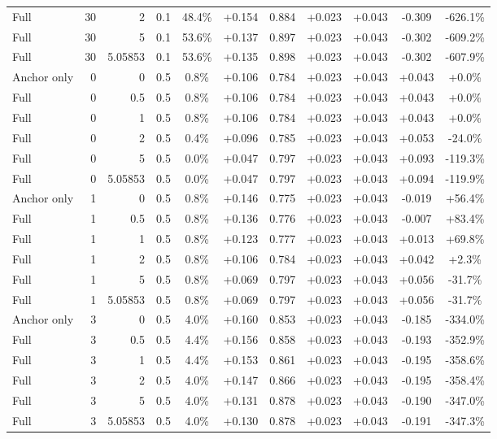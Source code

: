 \begin{table}[htbp]
\begin{tabular}{lrrrccccccc}
Full & 30 & 2 & 0.1 & 48.4\% & +0.154 & 0.884 & +0.023 & +0.043 & -0.309 & -626.1\% \\
Full & 30 & 5 & 0.1 & 53.6\% & +0.137 & 0.897 & +0.023 & +0.043 & -0.302 & -609.2\% \\
Full & 30 & 5.05853 & 0.1 & 53.6\% & +0.135 & 0.898 & +0.023 & +0.043 & -0.302 & -607.9\% \\
Anchor only & 0 & 0 & 0.5 & 0.8\% & +0.106 & 0.784 & +0.023 & +0.043 & +0.043 & +0.0\% \\
Full & 0 & 0.5 & 0.5 & 0.8\% & +0.106 & 0.784 & +0.023 & +0.043 & +0.043 & +0.0\% \\
Full & 0 & 1 & 0.5 & 0.8\% & +0.106 & 0.784 & +0.023 & +0.043 & +0.043 & +0.0\% \\
Full & 0 & 2 & 0.5 & 0.4\% & +0.096 & 0.785 & +0.023 & +0.043 & +0.053 & -24.0\% \\
Full & 0 & 5 & 0.5 & 0.0\% & +0.047 & 0.797 & +0.023 & +0.043 & +0.093 & -119.3\% \\
Full & 0 & 5.05853 & 0.5 & 0.0\% & +0.047 & 0.797 & +0.023 & +0.043 & +0.094 & -119.9\% \\
Anchor only & 1 & 0 & 0.5 & 0.8\% & +0.146 & 0.775 & +0.023 & +0.043 & -0.019 & +56.4\% \\
Full & 1 & 0.5 & 0.5 & 0.8\% & +0.136 & 0.776 & +0.023 & +0.043 & -0.007 & +83.4\% \\
Full & 1 & 1 & 0.5 & 0.8\% & +0.123 & 0.777 & +0.023 & +0.043 & +0.013 & +69.8\% \\
Full & 1 & 2 & 0.5 & 0.8\% & +0.106 & 0.784 & +0.023 & +0.043 & +0.042 & +2.3\% \\
Full & 1 & 5 & 0.5 & 0.8\% & +0.069 & 0.797 & +0.023 & +0.043 & +0.056 & -31.7\% \\
Full & 1 & 5.05853 & 0.5 & 0.8\% & +0.069 & 0.797 & +0.023 & +0.043 & +0.056 & -31.7\% \\
Anchor only & 3 & 0 & 0.5 & 4.0\% & +0.160 & 0.853 & +0.023 & +0.043 & -0.185 & -334.0\% \\
Full & 3 & 0.5 & 0.5 & 4.4\% & +0.156 & 0.858 & +0.023 & +0.043 & -0.193 & -352.9\% \\
Full & 3 & 1 & 0.5 & 4.4\% & +0.153 & 0.861 & +0.023 & +0.043 & -0.195 & -358.6\% \\
Full & 3 & 2 & 0.5 & 4.0\% & +0.147 & 0.866 & +0.023 & +0.043 & -0.195 & -358.4\% \\
Full & 3 & 5 & 0.5 & 4.0\% & +0.131 & 0.878 & +0.023 & +0.043 & -0.190 & -347.0\% \\
Full & 3 & 5.05853 & 0.5 & 4.0\% & +0.130 & 0.878 & +0.023 & +0.043 & -0.191 & -347.3\% \\

\end{tabular}
\end{table}
